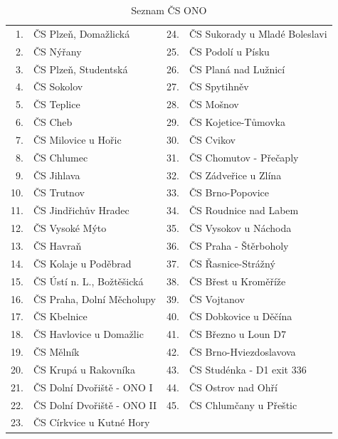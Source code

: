 \begin{table}[h]
    \centering
    \caption{Seznam ČS ONO}
    \label{tab:tank-ono-pobocky}
    \begin{tabular}{r l|r l}
        1.    & ČS Plzeň, Domažlická        & 24.   & ČS Sukorady u Mladé
                                                        Boleslavi\\
        2.    & ČS Nýřany                   & 25.   & ČS Podolí u Písku\\
        3.    & ČS Plzeň, Studentská        & 26.   & ČS Planá nad Lužnicí\\
        4.    & ČS Sokolov                  & 27.   & ČS Spytihněv\\
        5.    & ČS Teplice                  & 28.   & ČS Mošnov\\
        6.    & ČS Cheb                     & 29.   & ČS Kojetice-Tůmovka\\
        7.    & ČS Milovice u Hořic         & 30.   & ČS Cvikov\\
        8.    & ČS Chlumec                  & 31.   & ČS Chomutov - Přečaply\\
        9.    & ČS Jihlava                  & 32.   & ČS Zádveřice u Zlína\\
        10.   & ČS Trutnov                  & 33.   & ČS Brno-Popovice\\
        11.   & ČS Jindřichův Hradec        & 34.   & ČS Roudnice nad Labem\\
        12.   & ČS Vysoké Mýto              & 35.   & ČS Vysokov u Náchoda\\
        13.   & ČS Havraň                   & 36.   & ČS Praha - Štěrboholy\\
        14.   & ČS Kolaje u Poděbrad        & 37.   & ČS Řasnice-Strážný\\
        15.   & ČS Ústí n. L., Božtěšická   & 38.   & ČS Břest u Kroměříže\\
        16.   & ČS Praha, Dolní Měcholupy   & 39.   & ČS Vojtanov\\
        17.   & ČS Kbelnice                 & 40.   & ČS Dobkovice u Děčína\\
        18.   & ČS Havlovice u Domažlic     & 41.   & ČS Březno u Loun D7\\
        19.   & ČS Mělník                   & 42.   & ČS Brno-Hviezdoslavova\\
        20.   & ČS Krupá u Rakovníka        & 43.   & ČS Studénka - D1
                                                        exit 336\\
        21.   & ČS Dolní Dvořiště - ONO I   & 44.   & ČS Ostrov nad Ohří\\
        22.   & ČS Dolní Dvořiště - ONO II  & 45.   & ČS Chlumčany u Přeštic\\
        23.   & ČS Církvice u Kutné Hory
    \end{tabular}
\end{table}

